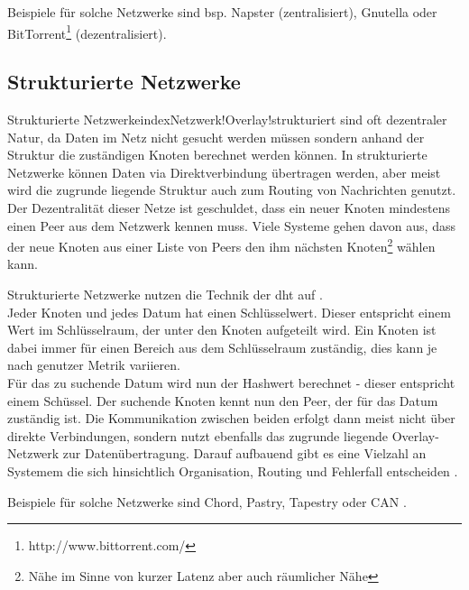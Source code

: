 Beispiele für solche Netzwerke sind bsp. Napster (zentralisiert), Gnutella oder BitTorrent\footnote{http://www.bittorrent.com/} (dezentralisiert).

\subsection{Strukturierte Netzwerke}
Strukturierte Netzwerkeindex{Netzwerk!Overlay!strukturiert} sind oft dezentraler Natur, da Daten im Netz nicht gesucht werden müssen sondern anhand der Struktur die zuständigen Knoten berechnet werden können. In strukturierte Netzwerke können Daten via Direktverbindung übertragen werden, aber meist wird die zugrunde liegende Struktur auch zum Routing von Nachrichten genutzt. Der Dezentralität dieser Netze ist geschuldet, dass ein neuer Knoten mindestens einen Peer aus dem Netzwerk kennen muss. Viele Systeme gehen davon aus, dass der neue Knoten aus einer Liste von Peers den ihm nächsten Knoten\footnote{Nähe im Sinne von kurzer Latenz aber auch räumlicher Nähe} wählen kann.

Strukturierte Netzwerke nutzen die Technik der \ac{dht} auf \cite{Wehrle2005, Ghodsi2006AlgorithmsDHT}.\\

Jeder Knoten und jedes Datum hat einen Schlüsselwert. Dieser entspricht einem Wert im Schlüsselraum, der unter den Knoten aufgeteilt wird. Ein Knoten ist dabei immer für einen Bereich aus dem Schlüsselraum zuständig, dies kann je nach genutzer Metrik variieren.\\
Für das zu suchende Datum wird nun der Hashwert berechnet - dieser entspricht einem Schüssel. Der suchende Knoten kennt nun den Peer, der für das Datum zuständig ist. Die Kommunikation zwischen beiden erfolgt dann meist nicht über direkte Verbindungen, sondern nutzt ebenfalls das zugrunde liegende Overlay-Netzwerk zur Datenübertragung. Darauf aufbauend gibt es eine Vielzahl an Systemem die sich hinsichtlich Organisation, Routing und Fehlerfall entscheiden \cite{Goetz2005}.

Beispiele für solche Netzwerke sind Chord, Pastry, Tapestry oder CAN \cite{Hosseini2007Survey, Rowstron2001, Zhao2001Tapestry,Zhao2004Tapestry, Ratnasamy2001Scalable}.








